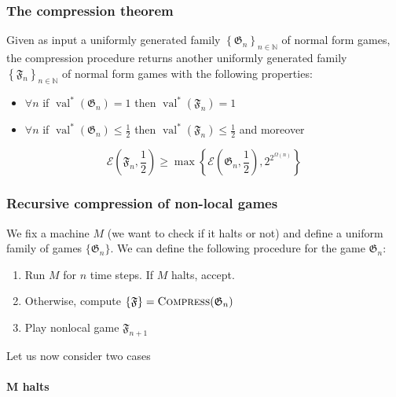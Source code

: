 \subsubsection{The compression theorem}
\begin{theorem}\label{th:compression}
     Given as input a uniformly generated family $\left\{\mathfrak{G}_{n}\right\}_{n \in \mathbb{N}}$ of normal form games, the compression procedure returns another uniformly generated family $\left\{\mathfrak{F}_{n}\right\}_{n \in \mathbb{N}}$ of normal form games with the following properties: 
     \begin{itemize}
     \item $\forall n$ if $\operatorname{val}^{*}\left(\mathfrak{G}_{{n}}\right)=1$ then $\operatorname{val}^{*}\left(\mathfrak{F}_{n}\right)=1$
        \item  $\forall n$ if $\operatorname{val}^{*}\left(\mathfrak{G}_{{n}}\right) \leq \frac{1}{2}$ then $\operatorname{val}^{*}\left(\mathfrak{F}_{n}\right) \leq \frac{1}{2}$ and moreover
     \end{itemize}
    \begin{equation}
    \mathscr{E}\left(\mathfrak{F}_{n}, \frac{1}{2}\right) \geq \max \left\{\mathscr{E}\left(\mathfrak{G}_{{n}}, \frac{1}{2}\right), 2^{2^{\Omega(n)}}\right\}
    \end{equation}
\end{theorem}
\subsubsection{Recursive compression of non-local games}
We fix a machine $M$ (we want to check if it halts or not) and define a uniform family of games $\{\mathfrak{G}_n\}$.
We can define the following procedure for the game $\mathfrak{G}_{n}$:

\begin{enumerate}
\item Run $M$ for $n$ time steps. If $M$ halts, accept.
\item Otherwise, compute $\{\mathfrak{F}\}= \textsc{Compress}({\mathfrak{G}_n})$
\item  Play nonlocal game $\mathfrak{F}_{n+1}$
\end{enumerate}

Let us now consider two cases 

\paragraph{M halts}

